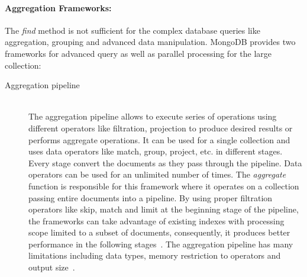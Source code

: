 \par
\paragraph{Aggregation Frameworks:}
 The \textit{find} method is not sufficient for the complex database queries like aggregation, grouping  and advanced data manipulation. MongoDB provides two frameworks for advanced query as well as parallel processing for the large collection:
 \begin{description}
		\item[Aggregation pipeline]  \hfill \\
		The aggregation pipeline allows to execute series of operations using different operators like filtration, projection to produce desired results or performs aggregate operations.  It can be used for a single collection and uses  data operators like match, group, project, etc. in different stages. Every stage convert the documents as they pass through the pipeline. Data operators can be used  for an unlimited number of times.  The \textit{aggregate} function is responsible for this framework where it operates on a collection passing  entire documents into a pipeline. By using proper filtration operators like  skip, match and limit at the beginning  stage of the pipeline,  the frameworks can take advantage of existing indexes with processing scope limited to a subset of documents, consequently, it  produces better performance in the following stages~\cite{mongodbaggregation}. The aggregation pipeline has many limitations including data types, memory restriction to operators and output size~\cite{nosql/comparision}. 
		

\end{description}
